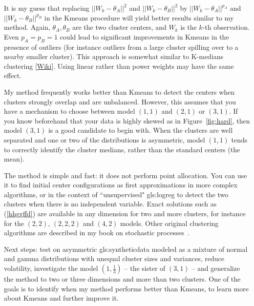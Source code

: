 \documentclass[oneside,10pt]{book}
\begin{document}
It is my guess that replacing $||W_k-\theta_A||^2$ and $||W_k-\theta_B||^2$ 
by $||W_k-\theta_A||^{p_A}$ and $||W_k-\theta_B||^{p_B}$ 
 in the Kmeans procedure will yield better results similar to my method. Again, $\theta_A, \theta_B$ are the two cluster centers, and $W_k$ is 
 the $k$-th observation. Even $p_A=p_B=1$ could lead to significant improvements in Kmeans in the presence of outliers (for instance outliers from
 a large cluster spilling over to a nearby smaller cluster). 
This approach is somewhat similar to \textcolor{index}{K-medians clustering} [\href{https://en.wikipedia.org/wiki/K-medians_clustering}{Wiki}]. Using linear rather than power weights may have the same effect. \vspace{1ex}


\noindent My method frequently works better than Kmeans to detect the centers when clusters strongly overlap and are unbalanced. However, this assumes that you have a 
mechanism to choose between model $(1, 1)$ and $(2, 1)$ or $(3, 1)$.  If you know beforehand that your data is highly skewed as in
 Figure~\ref{fig:hard}, then model $(3, 1)$ is a good candidate to begin with. When the clusters are well separated and one or two of the distributions is asymmetric,
 model $(1, 1)$ tends to correctly identify the cluster medians, rather than the standard centers (the mean). 

The method is simple and fast:  it does not perform point allocation. You can use it to find initial center configurations as first
 approximations in more complex algorithms, or in the context of ``unsupervised" 
\gls{gls:logreg}
 to detect the two clusters when there is no independent variable.  Exact solutions such as (\ref{hhggffd}) are available in any dimension for two and more clusters, for instance for the $(2, 2)$, $(2,2,2)$ and $(4, 2)$ models. Other original clustering algorithms are described in my book on stochastic processes~\cite{vgsimulnew}.

Next steps: test on asymmetric \gls{gls:syntheticdata} modeled as a mixture of normal and gamma distributions with unequal cluster sizes and variances, reduce volatility, investigate the model $(1, \frac{1}{3})$ -- the sister of $(3, 1)$ -- and generalize the method to two or three dimensions and more than two clusters. One of the goals is to identify when my method performs better than Kmeans, to learn more about Kmeans and further improve it. 
\end{document}
